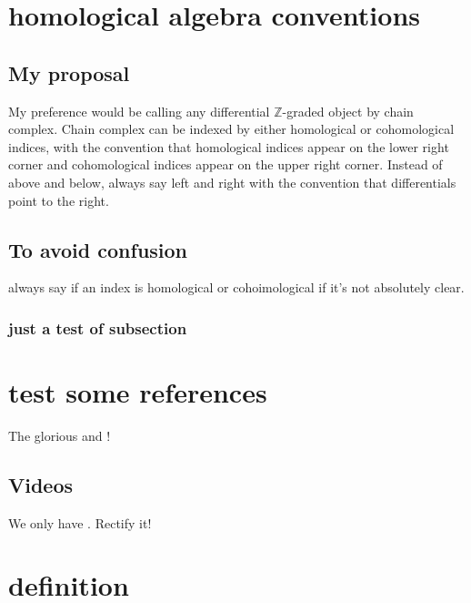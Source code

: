 %

\chapter{homological algebra conventions}
\section{My proposal}
My preference would be calling any differential $\mathbb{Z}$-graded object by chain complex.
Chain complex can be indexed by either homological or cohomological indices,
with the convention that homological indices appear on the lower right corner
and cohomological indices appear on the upper right corner.
Instead of above and below, always say left and right with the convention that differentials
point to the right.
\section{To avoid confusion}
always say if an index is homological or cohoimological if it's not absolutely clear.
\subsection{just a test of subsection}

\chapter{test some references}
The glorious \cite{condensed} and \cite{analytic}!
\section{Videos}
We only have \cite{ihesvid}. Rectify it!

\chapter{definition}

